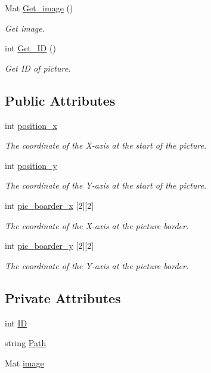\begin{DoxyCompactItemize}
Mat \hyperlink{class_picture_1_1_picture_a44b9bb7df596902509eb8fb41c24d38e}{Get\+\_\+image} ()
\begin{DoxyCompactList}\small\item\em Get image. \end{DoxyCompactList}\item 
int \hyperlink{class_picture_1_1_picture_af68efed56a47aecb9ccf5c2b505af2f2}{Get\+\_\+\+ID} ()
\begin{DoxyCompactList}\small\item\em Get ID of picture. \end{DoxyCompactList}\end{DoxyCompactItemize}
\subsection*{Public Attributes}
\begin{DoxyCompactItemize}
\item 
int \hyperlink{group___the_gabc618c40aa01ec5878903a3170e1867a}{position\+\_\+x}
\begin{DoxyCompactList}\small\item\em The coordinate of the X-\/axis at the start of the picture. \end{DoxyCompactList}\item 
int \hyperlink{group___the_gaad6be8d081af96530b6de3094b979af9}{position\+\_\+y}
\begin{DoxyCompactList}\small\item\em The coordinate of the Y-\/axis at the start of the picture. \end{DoxyCompactList}\item 
int \hyperlink{group__picture_ga62b9b579f0edd39a986aa614a6d51536}{pic\+\_\+boarder\+\_\+x} \mbox{[}2\mbox{]}\mbox{[}2\mbox{]}
\begin{DoxyCompactList}\small\item\em The coordinate of the X-\/axis at the picture border. \end{DoxyCompactList}\item 
int \hyperlink{group__picture_gaef6baa8934f351d974d75a43834c7738}{pic\+\_\+boarder\+\_\+y} \mbox{[}2\mbox{]}\mbox{[}2\mbox{]}
\begin{DoxyCompactList}\small\item\em The coordinate of the Y-\/axis at the picture border. \end{DoxyCompactList}\end{DoxyCompactItemize}
\subsection*{Private Attributes}
\begin{DoxyCompactItemize}
\item 
int \hyperlink{class_picture_1_1_picture_a96f8b585779e75511229adf4052fcb1c}{ID}
\item 
string \hyperlink{class_picture_1_1_picture_aa2a2802fbbad4a814012250c6dd1aa16}{Path}
\item 
Mat \hyperlink{class_picture_1_1_picture_a8e9f7ddce764bd0cb7be9250ea5b70a3}{image}
\end{DoxyCompactItemize}



